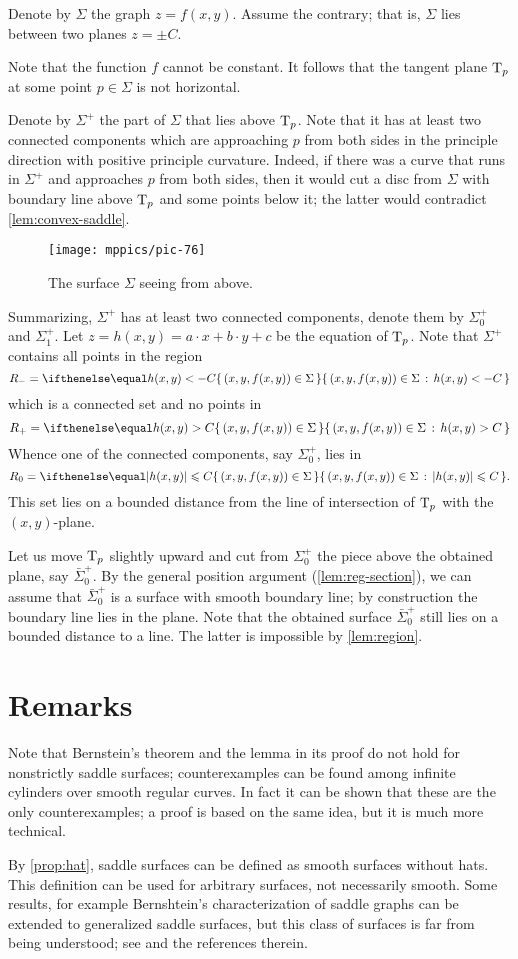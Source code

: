 Denote by $\Sigma$ the graph $z=f(x,y)$.
Assume the contrary; that is, $\Sigma$ lies between two planes $z=\pm C$.

Note that the function $f$ cannot be constant.
It follows that the tangent plane $\mathrm{T}_p$ at some point $p\in\Sigma$ is not horizontal.

Denote by $\Sigma^+$ the part of $\Sigma$ that lies above $\mathrm{T}_p$.
Note that it has at least two connected components which are approaching $p$ from both sides 
in the principle direction with positive principle curvature.
Indeed, if there was a curve that runs in $\Sigma^+$ and approaches $p$ from both sides, then it would cut a disc from $\Sigma$ with boundary line above $\mathrm{T}_p$ and some points below it;
the latter would contradict \ref{lem:convex-saddle}.

\begin{figure}[h!]
\vskip-0mm
\centering
\texttt{[image: mppics/pic-76]}
\caption*{The surface $\Sigma$ seeing from above.}
\vskip0mm
\end{figure}

Summarizing, $\Sigma^+$ has at least two connected components, denote them by $\Sigma^+_0$ and $\Sigma^+_1$.
Let $z=h(x,y)=a\cdot x+b\cdot y+c$ be the equation of $\mathrm{T}_p$.
Note that $\Sigma^+$ contains all points in the region
\[R_-=\set{(x,y,f(x,y))\in\Sigma}{h(x,y)< -C}\] 
which is a connected set and no points in 
\[R_+=\set{(x,y,f(x,y))\in\Sigma}{h(x,y)> C}\]
Whence one of the connected components, say $\Sigma^+_0$, lies in 
\[R_0=\set{(x,y,f(x,y))\in\Sigma}{|h(x,y)|\le  C}.\]
This set lies on a bounded distance from the line of intersection of $\mathrm{T}_p$ with the $(x,y)$-plane.

Let us move $\mathrm{T}_p$ slightly upward and cut from $\Sigma^+_0$ the piece above the obtained plane, say $\bar\Sigma^+_0$.
By the general position argument (\ref{lem:reg-section}),
we can assume that $\bar\Sigma^+_0$ is a surface with smooth boundary line;
by construction the boundary line lies in the plane.
Note that the obtained surface $\bar\Sigma^+_0$ still lies on a bounded distance to a line.
The latter is impossible by \ref{lem:region}.
\qeds

\section*{Remarks}

Note that Bernstein's theorem and the lemma in its proof do not hold for nonstrictly saddle surfaces;
counterexamples can be found among infinite cylinders over smooth regular curves.
In fact it can be shown that these are the only counterexamples;
a proof is based on the same idea, but it is much more technical.

By \ref{prop:hat}, saddle surfaces can be defined as smooth surfaces without hats.
This definition can be used for arbitrary surfaces, not necessarily smooth.
Some results, for example Bernshtein's characterization of saddle graphs can be extended to generalized saddle surfaces, but this class of surfaces is far from being understood; see \cite[Capter 4]{alexander-kapovitch-petrunin2019} and the references therein.
